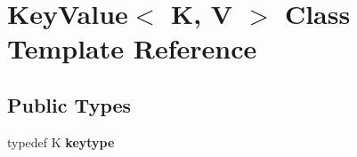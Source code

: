 \hypertarget{class_key_value}{\section{\-Key\-Value$<$ \-K, \-V $>$ \-Class \-Template \-Reference}
\label{class_key_value}
}
\subsection*{\-Public \-Types}
\begin{DoxyCompactItemize}
\item 
\hypertarget{class_key_value_ae1cb822a5b7f44313b8b15b05297793c}{typedef \-K {\bfseries keytype}}\label{class_key_value_ae1cb822a5b7f44313b8b15b05297793c}

\end{DoxyCompactItemize}
